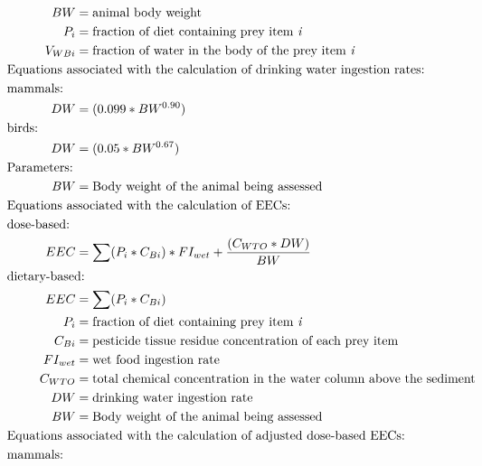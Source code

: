 \documentclass[10pt]{article}
\begin{document}
\begin{align*}
BW & = \text{animal body weight}\\
P_{i} & = \text{fraction of diet containing prey item \it{i}}\\
V_{WBi} & = \text{fraction of water in the body of the prey item \it{i}}\\
&    \hspace{-.75in}  \text{Equations associated with the calculation of drinking water ingestion rates:}\nonumber \\
&    \hspace{-0.75in} \text{mammals:}\nonumber \\
DW & = (0.099 * BW^{0.90})\\
&    \hspace{-0.75in} \text{birds:}\nonumber \\
DW & = (0.05 * BW^{0.67})\\
&    \hspace{-0.75in} \text{Parameters:}\nonumber \\
BW & = \text{Body weight of the animal being assessed}\\
&    \hspace{-.75in}  \text{Equations associated with the calculation of EECs:}\nonumber \\
&    \hspace{-0.75in} \text{dose-based:}\nonumber \\
EEC & = \sum(P_{i}*C_{Bi})*FI_{wet}+\frac{(C_{WTO}*DW)}{BW}\\
&    \hspace{-.75in}  \text{dietary-based:}\nonumber \\
EEC & = \sum(P_{i}*C_{Bi})\\
P_{i} & = \text{fraction of diet containing prey item \it{i}}\\
C_{Bi} & = \text{pesticide tissue residue concentration of each prey item}\\
FI_{wet} & = \text{wet food ingestion rate}\\
C_{WTO} & = \text{total chemical concentration in the water column above the sediment}\nonumber \\
DW & = \text{drinking water ingestion rate}\\
BW & = \text{Body weight of the animal being assessed}\\
&    \hspace{-.75in}  \text{Equations associated with the calculation of adjusted dose-based EECs:}\nonumber \\
&    \hspace{-.75in}  \text{mammals:}\nonumber \\

\end{align*}
\end{document}
